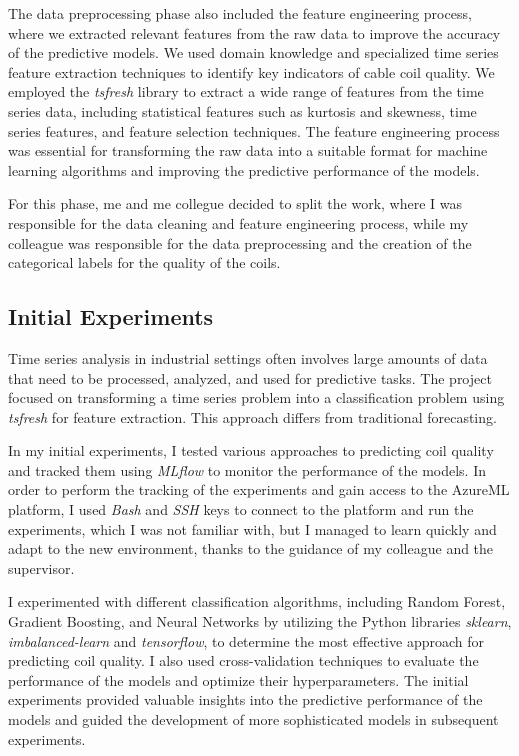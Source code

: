 The data preprocessing phase also included the feature engineering process,
where we extracted relevant features from the raw data to improve the accuracy
of the predictive models. We used domain knowledge and specialized time series
feature extraction techniques to identify key indicators of cable coil quality.
We employed the \emph{tsfresh} library to extract a wide range of features from
the time series data, including statistical features such as kurtosis and
skewness, time series features, and feature selection techniques. The feature
engineering process was essential for transforming the raw data into a suitable
format for machine learning algorithms and improving the predictive performance
of the models.

For this phase, me and me collegue decided to split the work, where I was
responsible for the data cleaning and feature engineering process, while my
colleague was responsible for the data preprocessing and the creation of the
categorical labels for the quality of the coils.

\subsection{Initial Experiments}

Time series analysis in industrial settings often involves large amounts of
data that need to be processed, analyzed, and used for predictive tasks. The
project focused on transforming a time series problem into a classification
problem using \emph{tsfresh} for feature extraction. This approach differs from
traditional forecasting.

In my initial experiments, I tested various approaches to predicting coil
quality and tracked them using \emph{MLflow} to monitor the performance of the
models. In order to perform the tracking of the experiments and gain access to
the AzureML platform, I used \emph{Bash} and \emph{SSH} keys to connect to the
platform and run the experiments, which I was not familiar with, but I managed
to learn quickly and adapt to the new environment, thanks to the guidance of my
colleague and the supervisor.

I experimented with different classification algorithms, including Random
Forest, Gradient Boosting, and Neural Networks by utilizing the Python
libraries \emph{sklearn}, \emph{imbalanced-learn} and \emph{tensorflow}, to
determine the most effective approach for predicting coil quality. I also used
cross-validation techniques to evaluate the performance of the models and
optimize their hyperparameters. The initial experiments provided valuable
insights into the predictive performance of the models and guided the
development of more sophisticated models in subsequent experiments.

